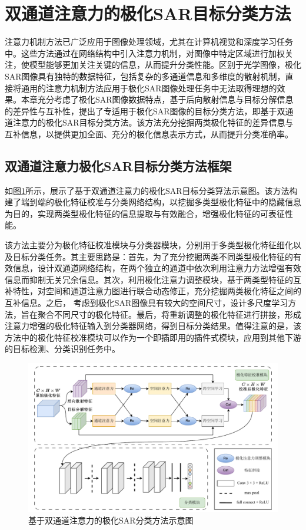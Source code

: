 \section{双通道注意力的极化SAR目标分类方法}
注意力机制方法已广泛应用于图像处理领域，尤其在计算机视觉和深度学习任务中。这些方法通过在网络结构中引入注意力机制，对图像中特定区域进行加权关注，使模型能够更加关注关键的信息，从而提升分类性能。区别于光学图像，极化SAR图像具有独特的数据特征，包括复杂的多通道信息和多维度的散射机制，直接将通用的注意力机制方法应用于极化SAR图像处理任务中无法取得理想的效果。本章充分考虑了极化SAR图像数据特点，基于后向散射信息与目标分解信息的差异性与互补性，提出了专适用于极化SAR图像的目标分类方法，即基于双通道注意力的极化SAR目标分类方法。该方法充分挖掘两类极化特征的差异信息与互补信息，以提供更加全面、充分的极化信息表示方式，从而提升分类准确率。

\subsection{双通道注意力极化SAR目标分类方法框架}
如图\ref{DPEN_framework}所示，展示了基于双通道注意力的极化SAR目标分类算法示意图。该方法构建了端到端的极化特征校准与分类网络结构，以挖掘多类型极化特征中的隐藏信息为目的，实现两类型极化特征的信息提取与有效融合，增强极化特征的可表征性能。

该方法主要分为极化特征校准模块与分类器模块，分别用于多类型极化特征细化以及目标分类任务。其主要思路是：首先，为了充分挖掘两类不同类型极化特征的有效信息，设计双通道网络结构，在两个独立的通道中依次利用注意力方法增强有效信息而抑制无关冗余信息。其次，利用极化注意力调整模块，基于两类型特征的互补特性，对空间和通道注意力图进行联合动态修正，充分挖掘两类极化特征之间的互补信息。之后， 考虑到极化SAR图像具有较大的空间尺寸，设计多尺度学习方法，旨在聚合不同尺寸的极化特征。最后，将重新调整的极化特征进行拼接，形成注意力增强的极化特征输入到分类器网络，得到目标分类结果。值得注意的是，该方法中的极化特征校准模块可以作为一个即插即用的插件式模块，应用到其他下游的目标检测、分类识别任务中。

\begin{figure}[ht!]
    \centering
    \includegraphics[width=14cm]{pic/chapter3/基于双通道注意力的极化SAR分类方法.pdf}
    \caption{基于双通道注意力的极化SAR分类方法示意图}
    \label{DPEN_framework}
\end{figure}

